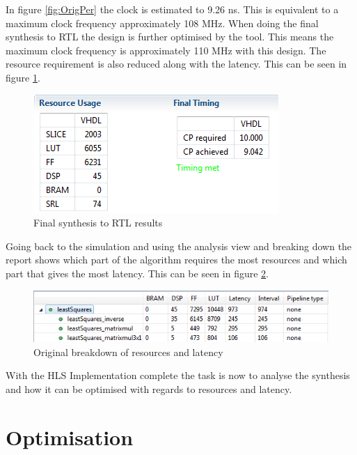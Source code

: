 In figure \ref{fig:OrigPer} the clock is  estimated to 9.26 ns. This is equivalent to a maximum clock frequency approximately 108 MHz. When doing the final synthesis to RTL the design is further optimised by the tool. This means the maximum clock frequency is approximately 110 MHz with this design. The resource requirement is also reduced along with the latency. This can be seen in figure \ref{fig:OriginalFinal}.
\begin{figure}[H]
\centering
\includegraphics[scale=1]{billeder/OriginalFinal}
\caption{Final synthesis to RTL results}
\label{fig:OriginalFinal}
\end{figure}
Going back to the simulation and using the analysis view and breaking down the report shows which part of the algorithm requires the most resources and which part that gives the most latency. This can be seen in figure \ref{fig:OrigBreak}.
\begin{figure}[H]
\centering
\includegraphics[scale=1]{billeder/OriginalAreaLatency}
\caption{Original breakdown of resources and latency}
\label{fig:OrigBreak}
\end{figure}
With the HLS Implementation complete the task is now to analyse the synthesis and how it can be optimised with regards to resources and latency.
\section{Optimisation}
